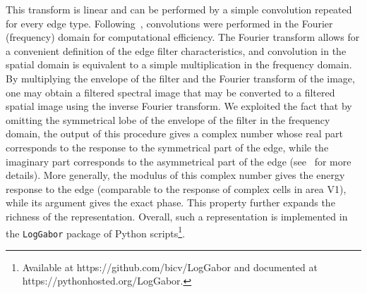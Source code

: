 \documentclass[a4paper, 10pt, twocolumns]{article}
\newcommand{\url}[1]{{\rm #1}}
\begin{document}
This transform is linear and can be performed by a simple convolution repeated for every edge type. Following~\citep{Fischer07cv}, convolutions were performed in the Fourier (frequency) domain for computational efficiency. The Fourier transform allows for a convenient definition of the edge filter characteristics, and convolution in the spatial domain is equivalent to a simple multiplication in the frequency domain. By multiplying the envelope of the filter and the Fourier transform of the image, one may obtain a filtered spectral image that may be converted to a filtered spatial image using the inverse Fourier transform. We exploited the fact that by omitting the symmetrical lobe of the envelope of the filter in the frequency domain, the output of this procedure gives a complex number whose real part corresponds to the response to the symmetrical part of the edge, while the imaginary part corresponds to the asymmetrical part of the edge (see~\citep{Fischer07cv} for more details). More generally, the modulus of this complex number gives the energy response to the edge (comparable to the response of complex cells in area V1), while its argument gives the exact phase. This property further expands the richness of the representation. Overall, such a representation is implemented in the \verb+LogGabor+ package of Python scripts\footnote{Available at \url{https://github.com/bicv/LogGabor} and documented at \url{https://pythonhosted.org/LogGabor}.}.
\end{document}

